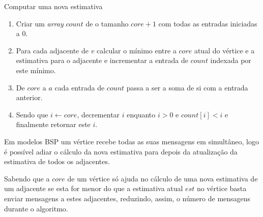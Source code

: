 \begin{algorithm}
\caption{Computar uma nova estimativa}
\label{alg:kCoreDisNew}

\begin{enumerate}
	\item Criar um \textit{array} $count$ de o tamanho $core+1$ com todas as entradas iniciadas a $0$.
	\item Para cada adjacente de $v$ calcular o mínimo entre a $core$ atual do vértice e a estimativa para o adjacente e incrementar a entrada de $count$ indexada por este mínimo.
	\item De $core$ a $a$ cada entrada de $count$ passa a ser a soma de si com a entrada anterior.
	\item Sendo que $i \gets core$, decrementar $i$ enquanto $i > 0$ e $count[i] < i$ e finalmente retornar este $i$.
\end{enumerate}
\end{algorithm}
Em modelos BSP um vértice recebe todas as suas mensagens em simultâneo, logo é possível adiar o cálculo da nova estimativa para depois da atualização da estimativa de todos os adjacentes. 

Sabendo que a $core$ de um vértice só ajuda no cálculo de uma nova estimativa de um adjacente se esta for menor do que a estimativa atual $est$ no vértice basta enviar mensagens a estes adjacentes, reduzindo, assim, o número de mensagens durante o algoritmo.

